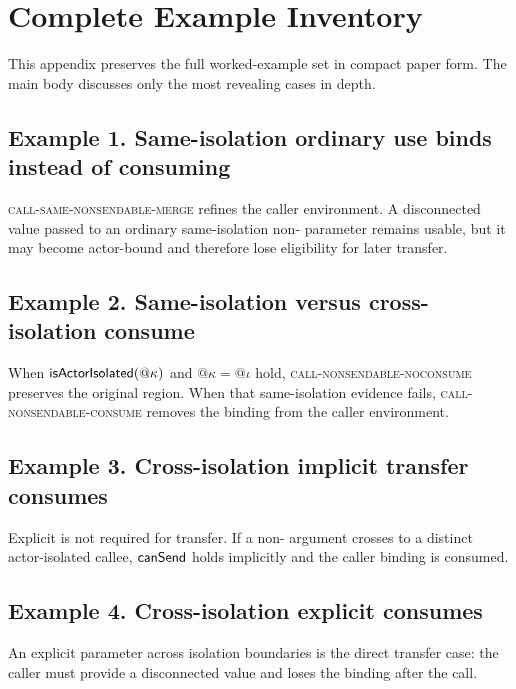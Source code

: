 \section{Complete Example Inventory}
\label{sec:appendix-examples}

This appendix preserves the full worked-example set in compact paper form. The main body discusses only the most revealing cases in depth.

\subsection{Example 1. Same-isolation ordinary use binds instead of consuming}

\textsc{call-same-nonsendable-merge} refines the caller environment. A disconnected value passed to an ordinary same-isolation non- parameter remains usable, but it may become actor-bound and therefore lose eligibility for later transfer.

\subsection{Example 2. Same-isolation  versus cross-isolation consume}

When $\textsf{isActorIsolated}(@\kappa)$ and $@\kappa = @\iota$ hold, \textsc{call-nonsendable-noconsume} preserves the original region. When that same-isolation evidence fails, \textsc{call-nonsendable-consume} removes the binding from the caller environment.


\subsection{Example 3. Cross-isolation implicit transfer consumes}

Explicit  is not required for transfer. If a non- argument crosses to a distinct actor-isolated callee, $\textsf{canSend}$ holds implicitly and the caller binding is consumed.

\subsection{Example 4. Cross-isolation explicit  consumes}

An explicit  parameter across isolation boundaries is the direct transfer case: the caller must provide a disconnected value and loses the binding after the call.

